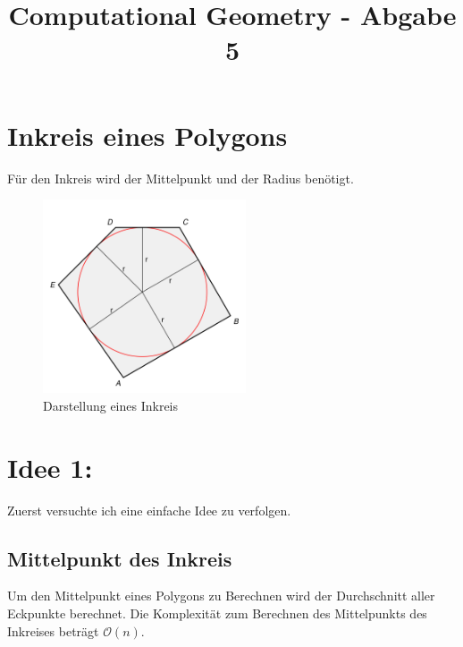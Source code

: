 \documentclass[conference]{IEEEtran}
\begin{document}
	
	\title{Computational Geometry - Abgabe 5}
	
	\author{
	}
	
	\maketitle
	
	

	\section{Inkreis eines Polygons}
	Für den Inkreis wird der Mittelpunkt und der Radius benötigt.
	\begin{figure}[h]
		\begin{center}
			\includegraphics[width=6cm]{Pentagon-inscribed-circle.svg.png}
			\caption{Darstellung eines Inkreis \cite{b1}}
			\label{inkreis}
		\end{center}
	\end{figure}
	
	\section{Idee 1:}
	Zuerst versuchte ich eine einfache Idee zu verfolgen.
	\subsection{Mittelpunkt des Inkreis}
	Um den Mittelpunkt eines Polygons zu Berechnen wird der Durchschnitt aller Eckpunkte berechnet.
	Die Komplexität zum Berechnen des Mittelpunkts des Inkreises beträgt $\mathcal{O}(n)$. 
\end{document}
